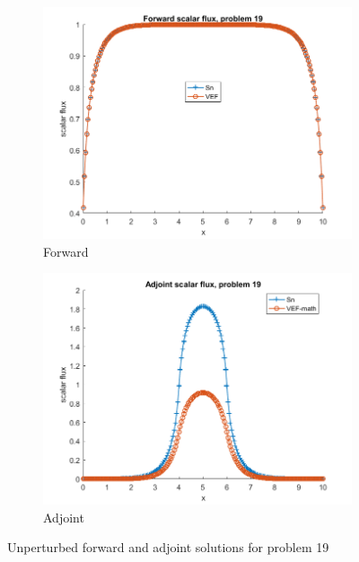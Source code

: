 \documentclass{article}
\begin{document}
\begin{figure}[H]
\centering
\begin{subfigure}{.5\textwidth}
  \centering
  \includegraphics[width=1\linewidth]{p19f.png}
  \caption{Forward}
  \label{fig:sub1}
\end{subfigure}%
\begin{subfigure}{.5\textwidth}
  \centering
  \includegraphics[width=1\linewidth]{p19a.png}
  \caption{Adjoint}
  \label{fig:sub2}
\end{subfigure}
\caption{Unperturbed forward and adjoint solutions for problem 19}
\label{fig:test}
\end{figure}
\end{document}
